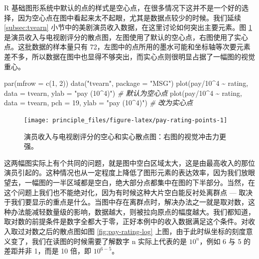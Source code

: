 \documentclass[
  b5paper,
  UTF8,twoside]{book}
\newenvironment{Shaded}{\begin{snugshade}}{\end{snugshade}}
\newcommand{\AttributeTok}[1]{\textcolor[rgb]{0.77,0.63,0.00}{#1}}
\newcommand{\CommentTok}[1]{\textcolor[rgb]{0.56,0.35,0.01}{\textit{#1}}}
\newcommand{\DecValTok}[1]{\textcolor[rgb]{0.00,0.00,0.81}{#1}}
\newcommand{\FunctionTok}[1]{\textcolor[rgb]{0.00,0.00,0.00}{#1}}
\newcommand{\NormalTok}[1]{#1}
\newcommand{\SpecialCharTok}[1]{\textcolor[rgb]{0.00,0.00,0.00}{#1}}
\newcommand{\StringTok}[1]{\textcolor[rgb]{0.31,0.60,0.02}{#1}}
\begin{document}
R 基础图形系统中默认的点的样式是空心点，在很多情况下这并不是一个好的选择，因为空心点在图中看起来太不起眼，尤其是数据点较少的时候。我们延续 \ref{subsec:tvearn} 小节中的美剧演员收入数据，在这里讨论如何突出主要元素。图 \ref{fig:pay-rating-points} 是演员收入与电视剧评分的散点图，左图使用了默认的空心点，右图使用了实心点。这批数据的样本量只有 72，左图中的点所用的墨水可能和坐标轴等次要元素差不多，所以数据在图中也显得不够突出，而实心点则很明显占据了一幅图的视觉重心。

\begin{Shaded}
\begin{Highlighting}[]
\FunctionTok{par}\NormalTok{(}\AttributeTok{mfrow =} \FunctionTok{c}\NormalTok{(}\DecValTok{1}\NormalTok{, }\DecValTok{2}\NormalTok{))}
\FunctionTok{data}\NormalTok{(}\StringTok{"tvearn"}\NormalTok{, }\AttributeTok{package =} \StringTok{"MSG"}\NormalTok{)}
\FunctionTok{plot}\NormalTok{(pay}\SpecialCharTok{/}\DecValTok{10}\SpecialCharTok{\^{}}\DecValTok{4} \SpecialCharTok{\textasciitilde{}}\NormalTok{ rating, }\AttributeTok{data =}\NormalTok{ tvearn, }\AttributeTok{ylab =} \StringTok{"pay (10\^{}4)"}\NormalTok{) }\CommentTok{\# 默认为空心点}
\FunctionTok{plot}\NormalTok{(pay}\SpecialCharTok{/}\DecValTok{10}\SpecialCharTok{\^{}}\DecValTok{4} \SpecialCharTok{\textasciitilde{}}\NormalTok{ rating, }\AttributeTok{data =}\NormalTok{ tvearn, }\AttributeTok{pch =} \DecValTok{19}\NormalTok{, }\AttributeTok{ylab =} \StringTok{"pay (10\^{}4)"}\NormalTok{) }\CommentTok{\# 改为实心点}
\end{Highlighting}
\end{Shaded}

\begin{figure}

{\centering \texttt{[image: principle\_files/figure-latex/pay-rating-points-1]} 

}

\caption[演员收入与电视剧评分的空心和实心散点图]{演员收入与电视剧评分的空心和实心散点图：右图的视觉冲击力更强。}\label{fig:pay-rating-points}
\end{figure}



这两幅图实际上有个共同的问题，就是图中空白区域太大，这是由最高收入的那位演员引起的。这种情况也从一定程度上降低了图形元素的表达效率，因为我们放眼望去，一幅图的一半区域都是空白，绝大部分点都集中在图的下半部分。当然，在这个问题上我们也不能绝对化，因为有时候这种大片空白能反衬处离群点 --- 取决于我们要显示的重点是什么。当图中存在离群点时，解决办法之一就是取对数，这种办法能减轻数量级的影响，数据越大，则被拉向原点的幅度越大。我们都知道，取对数的前提条件是数字全都大于零，正好本例中的收入数据满足这个条件。对收入取过对数之后的散点图如图 \ref{fig:pay-rating-log} 上图，由于此时纵坐标的刻度意义变了，我们在读图的时候需要了解数字 n 实际上代表的是 \(10^{n}\)，例如 6 与 5 的差距并非 1，而是 10 倍，即 \(10^{6-5}\)。
\end{document}
